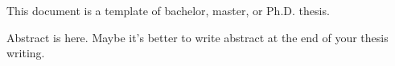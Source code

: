 ﻿This document is a template of bachelor, master, or Ph.D. thesis.

\par
Abstract is here.
Maybe it's better to write abstract at the end of your thesis writing.
